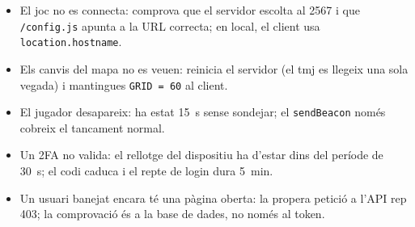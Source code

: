 \documentclass[10pt,a4paper]{article}
\begin{document}
\begin{itemize}[nosep]
  \item El joc no es connecta: comprova que el servidor escolta al 2567 i que
        \texttt{/config.js} apunta a la URL correcta; en local, el client usa
        \texttt{location.hostname}.
  \item Els canvis del mapa no es veuen: reinicia el servidor (el tmj es llegeix una
        sola vegada) i mantingues \texttt{GRID = 60} al client.
  \item El jugador desapareix: ha estat 15~s sense sondejar; el \texttt{sendBeacon}
        només cobreix el tancament normal.
  \item Un 2FA no valida: el rellotge del dispositiu ha d'estar dins del període de
        30~s; el codi caduca i el repte de login dura 5~min.
  \item Un usuari banejat encara té una pàgina oberta: la propera petició a l'API rep
        403; la comprovació és a la base de dades, no només al token.
\end{itemize}
\end{document}
